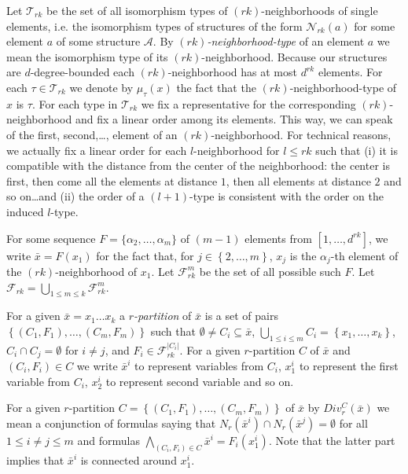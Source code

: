 \documentclass{LMCS}
\newcommand\set[1]{\ensuremath{\{#1\}}\xspace}
\newcommand\cA{\ensuremath{{\mathcal A}}\xspace}
\newcommand\cN{\ensuremath{{\mathcal N}}\xspace}
\newcommand{\T}{\ensuremath{{\mathcal T}}}
\newcommand{\F}{\ensuremath{{\mathcal F}}}
\begin{document}
Let $\T_{rk}$ be the set of all isomorphism types of $(rk)$-neighborhoods of
single elements, i.e. the isomorphism types of structures of the form
$\cN_{rk}(a)$ for some element $a$ of some structure \cA. By
\emph{$(rk)$-neighborhood-type} of an element $a$ we mean the isomorphism type
of its $(rk)$-neighborhood. Because our structures are $d$-degree-bounded each
$(rk)$-neighborhood has at most $d^{rk}$ elements. For each $\tau \in \T_{rk}$ we
denote by $\mu_\tau(x)$ the fact that the $(rk)$-neighborhood-type of $x$ is $\tau$. For
each type in $\T_{rk}$ we fix a representative for the corresponding
$(rk)$-neighborhood and fix a linear order among its elements. This way, we can
speak of the first, second,\ldots, element of an $(rk)$-neighborhood. For
technical reasons, we actually fix a linear order for each $l$-neighborhood for
$l\leq rk$ such that (i) it is compatible with the distance from the center of
the neighborhood: the center is first, then come all the elements at distance
$1$, then all elements at distance $2$ and so on\ldots and (ii) the order of a
$(l+1)$-type is consistent with the order on the induced $l$-type.

For some sequence $F=\set{\alpha_2,\ldots,\alpha_{m}}$ of $(m-1)$ elements from
$[1, \ldots, d^{rk}]$, we write $\bar x=F(x_1)$ for the fact that, for
$j \in \left\{2, \ldots, m\right\}$, $x_j$ is the
$\alpha_j$-th element of the $(rk)$-neighborhood of $x_1$. Let $\F_{rk}^{m}$ be the
set of all possible such $F$. Let $\F_{rk} = \bigcup_{1 \leq m \leq k} \F_{rk}^{m}$.

For a given $\bar x = x_1 \ldots x_{k}$ a \emph{$r$-partition} of $\bar x$
is a set of pairs $\left\{ (C_{1}, F_{1}), \ldots, (C_{m}, F_{m}) \right\}$ such that
$\emptyset \neq C_{i} \subseteq \bar x$, $\bigcup_{1\leq i \leq m} C_{i} =
\left\{ x_1, \ldots, x_{k} \right\}$,  $C_{i} \cap C_{j} = \emptyset$ for
$i \neq j$, and $F_{i} \in \F_{rk}^{|C_{i}|}$. For a given $r$-partition $C$ of $\bar x$ and
$(C_{i}, F_{i}) \in C$ we write $\bar x^{i}$ to represent variables from
$C_{i}$, $x_1^i$ to represent the first variable from $C_{i}$, $x_2^i$ to represent second
variable and so on.

For a given $r$-partition $C = \left\{ (C_{1}, F_{1}), \ldots, (C_{m}, F_{m}) \right\}$
of $\bar x$ by $Div_{r}^{C}(\bar x)$ we mean a conjunction of formulas
saying that $N_r(\bar x^{i}) \cap N_r(\bar x^{j}) =\emptyset$ for all
$1 \leq i\neq j \leq m$ and formulas $\bigwedge_{(C_i,F_i) \in C} \bar x^i = F_i(x_1^i)$.
Note that the latter part implies that $\bar x^i$ is connected around $x_1^i$.
\end{document}
